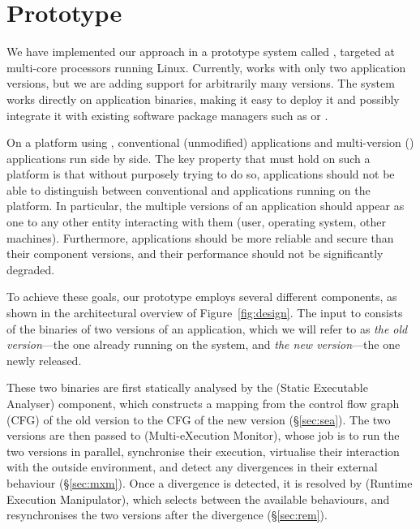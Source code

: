 \section{Prototype}
\label{sec:mx}


We have implemented our approach in a prototype system called \mx,
targeted at multi-core processors running Linux.  Currently, \mx works
with only two application versions, but we are adding support for
arbitrarily many versions.  The system works directly on application
binaries, making it easy to deploy it and possibly integrate it with
existing software package managers such as 
or .

On a platform using \mx, conventional (\ie unmodified) applications
and multi-version (\mv) applications run side by side.  The key
property that must hold on such a platform is that without purposely
trying to do so, applications should not be able to distinguish
between conventional and \mv applications running on the platform. In
particular, the multiple versions of an \mv application should appear
as one to any other entity interacting with them (\eg user, operating
system, other machines).  Furthermore, \mv applications should be more
reliable and secure than their component versions, and their
performance should not be significantly degraded.

To achieve these goals, our prototype \mx employs several different
components, as shown in the architectural overview of
Figure~\ref{fig:design}.  The input to \mx consists of the binaries of
two versions of an application, which we will refer to as 
\textit{the old version}---the one already running on the system, and 
\textit{the new version}---the one newly released.


These two binaries are first statically analysed by the \sea (Static
Executable Analyser) component, which constructs a mapping from the
control flow graph (CFG) of the old version to the CFG of the new
version (\S\ref{sec:sea}).  The two versions are then passed to \mxm
(Multi-eXecution Monitor), whose job is to run the two versions in
parallel, synchronise their execution, virtualise their interaction
with the outside environment, and detect any divergences in their
external behaviour (\S\ref{sec:mxm}).  Once a divergence is detected,
it is resolved by \rem (Runtime Execution Manipulator), which selects
between the available behaviours, and resynchronises the two versions
after the divergence (\S\ref{sec:rem}).

